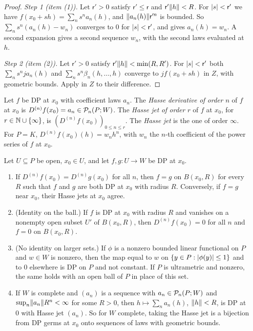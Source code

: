 \begin{proof}
\emph{Step 1 (item (1)).} Let $\mathsf r'>0$ satisfy $\mathsf r'\le\mathsf r$ and $\mathsf r'\lVert h\rVert<R$. For $\lvert s\rvert<\mathsf r'$ we have $f(x_0+sh)=\sum_ns^na_n(h)$, and $\lVert a_n(h)\rVert\mathsf r'^n$ is bounded. So $\sum_ns^n(a_n(h)-w_n)$ converges to $0$ for $\lvert s\rvert<\mathsf r'$, and \cite[Lemma~A.1]{I} gives $a_n(h)=w_n$. A second expansion gives a second sequence $w_n$, with the second laws evaluated at $h$.

\emph{Step 2 (item (2)).} Let $\mathsf r'>0$ satisfy $\mathsf r'\lVert h\rVert<\min(R,R')$. For $\lvert s\rvert<\mathsf r'$ both $\sum_ns^nja_n(h)$ and $\sum_ns^n\beta_n(h,\dots,h)$ converge to $jf(x_0+sh)$ in $Z$, with geometric bounds. Apply \cite[Lemma~A.1]{I} in $Z$ to their difference.
\end{proof}

\begin{definition}\label{dp:def:hasse}
Let $f$ be DP at $x_0$ with coefficient laws $a_n$. The \emph{Hasse derivative of order $n$} of $f$ at $x_0$ is $D^{(n)}f(x_0)=a_n\in\mathcal P_n(P;W)$. The \emph{Hasse jet of order $r$} of $f$ at $x_0$, for $r\in\mathbb N\cup\{\infty\}$, is $(D^{(n)}f(x_0))_{0\le n\le r}$. The \emph{Hasse jet} is the one of order $\infty$. For $P=K$, $D^{(n)}f(x_0)(h)=w_nh^n$, with $w_n$ the $n$-th coefficient of the power series of $f$ at $x_0$.
\end{definition}

\begin{theorem}\label{dp:thm:quasi-analytic}
Let $U\subseteq P$ be open, $x_0\in U$, and let $f,g\colon U\to W$ be DP at $x_0$.
\begin{enumerate}
\item If $D^{(n)}f(x_0)=D^{(n)}g(x_0)$ for all $n$, then $f=g$ on $B(x_0,R)$ for every $R$ such that $f$ and $g$ are both DP at $x_0$ with radius $R$. Conversely, if $f=g$ near $x_0$, their Hasse jets at $x_0$ agree.
\item \textup{(Identity on the ball.)} If $f$ is DP at $x_0$ with radius $R$ and vanishes on a nonempty open subset $U'$ of $B(x_0,R)$, then $D^{(n)}f(x_0)=0$ for all $n$ and $f=0$ on $B(x_0,R)$.
\item \textup{(No identity on larger sets.)} If $\phi$ is a nonzero bounded linear functional on $P$ and $w\in W$ is nonzero, then the map equal to $w$ on $\{y\in P:\lvert \phi(y)\rvert\le1\}$ and to $0$ elsewhere is DP on $P$ and not constant. If $P$ is ultrametric and nonzero, the same holds with an open ball of $P$ in place of this set.
\item If $W$ is complete and $(a_n)$ is a sequence with $a_n\in\mathcal P_n(P;W)$ and $\sup_n\lVert a_n\rVert R^n<\infty$ for some $R>0$, then $h\mapsto\sum_na_n(h)$, $\lVert h\rVert<R$, is DP at $0$ with Hasse jet $(a_n)$. So for $W$ complete, taking the Hasse jet is a bijection from DP germs at $x_0$ onto sequences of laws with geometric bounds.
\end{enumerate}
\end{theorem}

